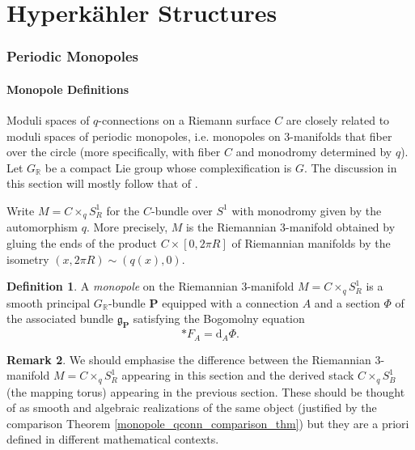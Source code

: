 \documentclass[11pt, oneside, reqno]{amsart}
\theoremstyle{definition} \newtheorem{definition}{Definition}[section]
\theoremstyle{definition} \newtheorem{remark}[definition]{Remark}
\theoremstyle{definition} \newtheorem{remarks}[definition]{Remarks}
\theoremstyle{definition} \newtheorem{question}[definition]{Question}
\theoremstyle{definition} \newtheorem*{note}{Note}
\theoremstyle{definition} \newtheorem{example}[definition]{Example}
\theoremstyle{definition} \newtheorem{examples}[definition]{Examples}
\renewcommand{\gg}{\mathfrak{g}}
\newcommand{\bo}[1]{\boldsymbol{#1}}
\newcommand{\RR}{\mathbb{R}}
\renewcommand{\d}{\mathrm{d}}
\begin{document}
\part{Hyperk\"ahler Structures}

\section{Periodic Monopoles} \label{periodic_monopole_section}
\subsection{Monopole Definitions}
Moduli spaces of $q$-connections on a Riemann surface $C$ are closely related to moduli spaces of periodic monopoles, i.e. monopoles on 3-manifolds that fiber over the circle (more specifically, with fiber $C$ and monodromy determined by $q$).  Let $G_\RR$ be a compact Lie group whose complexification is $G$.  The discussion in this section will mostly follow that of \cite{CharbonneauHurtubise, Smith}.

Write $M = C\times_q S^1_R$ for the $C$-bundle over $S^1$ with monodromy given by the automorphism $q$.  More precisely, $M$ is the Riemannian 3-manifold obtained by gluing the ends of the product $C \times [0,2\pi R]$ of Riemannian manifolds by the isometry $(x,2\pi R) \sim (q(x), 0)$.

\begin{definition}
A \emph{monopole} on the Riemannian 3-manifold $M = C \times_q S^1_R$ is a smooth principal $G_\RR$-bundle $\bo P$ equipped with a connection $A$ and a section $\Phi$ of the associated bundle $\gg_{\bo P}$ satisfying the Bogomolny equation 
\[\ast F_A = \d_A \Phi.\]
\end{definition}

\begin{remark}
We should emphasise the difference between the Riemannian 3-manifold $M = C \times_q S^1_R$ appearing in this section and the derived stack $C \times_q S^1_B$ (the mapping torus) appearing in the previous section.  These should be thought of as smooth and algebraic realizations of the same object (justified by the comparison Theorem \ref{monopole_qconn_comparison_thm}) but they are a priori defined in different mathematical contexts.
\end{remark}
\end{document}
